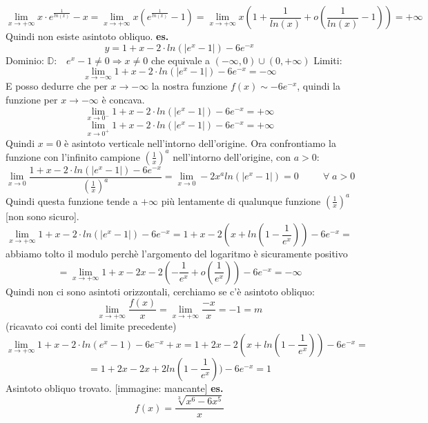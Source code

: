 \[
    \lim_{x\rightarrow +\infty} x \cdot  e ^{\frac{1}{ln(x)}} -x = \lim_{x\rightarrow +\infty} x(e ^{\frac{1}{ln(x)}} -1) = \lim_{x\rightarrow +\infty} x(1+ \frac{1}{ln(x)} + o(\frac{1}{ln(x)} -1)) = + \infty
\]
Quindi non esiste asintoto obliquo. \newline
\newline
\newline
\newline
\textbf{es.} 
\[
    y= 1+x-2 \cdot ln(|e^x -1|) - 6 e ^{-x}
\]
Dominio: $\mathbb{D}: \;\;\; e^x -1 \neq 0 \Rightarrow x\neq 0$ che equivale a $(-\infty,0) \cup (0,+\infty)$\newline
Limiti:
\[
    \lim_{x\rightarrow -\infty} 1+x-2 \cdot ln(|e^x -1|) - 6 e ^{-x} = -\infty
\]
E posso dedurre che per $x \rightarrow  -\infty$ la nostra funzione $f(x) \sim  -6e^{-x}$, quindi la funzione per $x \rightarrow  -\infty$ è concava.
\[
    \lim_{x\rightarrow 0^- } 1+x-2 \cdot ln(|e^x -1|) - 6 e ^{-x} = +\infty
\]
\[
    \lim_{x\rightarrow 0^+ } 1+x-2 \cdot ln(|e^x -1|) - 6 e ^{-x} = +\infty    
\]
Quindi $x=0$ è asintoto verticale nell'intorno dell'origine. Ora confrontiamo la funzione con l'infinito campione $(\frac{1}{x})^a$ nell'intorno dell'origine, con $a>0$:
\[
    \lim_{x\rightarrow 0} \frac{1+x-2 \cdot ln(|e^x -1|) - 6 e ^{-x} }{(\frac{1}{x})^a} = \lim_{x \rightarrow 0 } -2x^a ln(|e^x-1|) = 0 \;\;\;\;\;\;\;\;\;\forall\;a > 0 
\]
Quindi questa funzione tende a $+\infty$ più lentamente di qualunque funzione $(\frac{1}{x})^a$ [non sono sicuro].
\[
    \lim_{x\rightarrow +\infty} 1+x-2 \cdot ln(|e^x -1|) - 6 e ^{-x} = 1+x-2(x + ln(1-\frac{1}{e^x})) -6 e^{-x} =
\]
abbiamo tolto il modulo perchè l'argomento del logaritmo è sicuramente positivo
\[
    =\lim_{x\rightarrow + \infty} 1 +x -2x -2(-\frac{1}{e^x} + o(\frac{1}{e^x})) - 6 e^{-x} = -\infty
\]
Quindi non ci sono asintoti orizzontali, cerchiamo se c'è asintoto obliquo:
\[
    \lim_{x\rightarrow +\infty} \frac{f(x)}{x} = \lim_{x\rightarrow +\infty} \frac{-x}{x} = -1 = m
\]
(ricavato coi conti del limite precedente)
\[
    \lim_{x\rightarrow +\infty} 1+x-2 \cdot ln(e^x -1) - 6 e ^{-x} +x = 1+2x-2(x + ln(1- \frac{1}{e^x})) - 6 e ^{-x} =
\]
\[
    =1+2x-2x + 2ln(1- \frac{1}{e^x})) - 6 e ^{-x} = 1
\]
Asintoto obliquo trovato.
[immagine: mancante]\newline
\newline
\newline
\newline
\textbf{es.} 
\[
    f(x) = \frac{\sqrt[3]{x^6-6x^5}}{x}
\]
